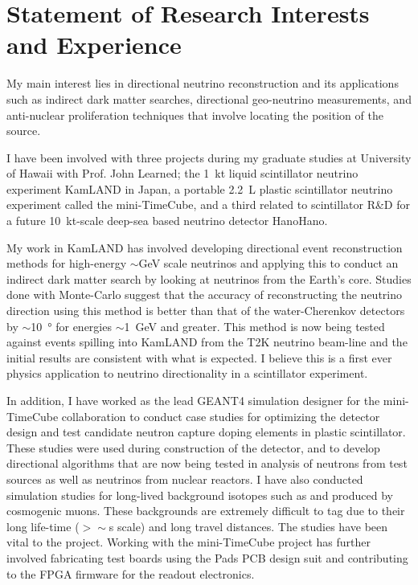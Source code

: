 \documentclass[a4paper,10pt]{article} %
\begin{document}

\section{Statement of Research Interests and Experience}
My main interest lies in directional neutrino reconstruction and its
applications such as indirect dark matter searches, directional geo-neutrino
measurements, and anti-nuclear proliferation techniques that involve locating
the position of the source.

I have been involved with three projects during my graduate studies at
University of Hawaii with Prof. John Learned; the \SI{1}{\kilo\tonne} liquid
scintillator neutrino experiment KamLAND in Japan, a portable
\SI{2.2}{\liter} plastic scintillator neutrino experiment called the
mini-TimeCube, and a third related to scintillator R\&D for a
future \SI{10}{\kilo\tonne}-scale deep-sea based neutrino detector HanoHano.

My work in KamLAND has involved developing directional event reconstruction
methods for high-energy $\sim$\si{\giga\electronvolt} scale neutrinos and
applying this to conduct an indirect dark matter search by looking at neutrinos
from the Earth's core.
Studies done with Monte-Carlo suggest that the accuracy of reconstructing the
neutrino direction using this method is better than that of the
water-Cherenkov detectors by $\sim$\SI{10}{\degree} for energies
$\sim$\SI{1}{\giga\electronvolt} and greater.
This method is now being tested against events spilling into KamLAND from the
T2K neutrino beam-line and the initial results are consistent with what is
expected.
I believe this is a first ever physics application to neutrino directionality in
a scintillator experiment.

In addition, I have worked as the lead GEANT4 simulation designer for the
mini-TimeCube collaboration to conduct case studies for optimizing the detector
design and test candidate neutron capture doping elements in plastic
scintillator.
These studies were used during construction of the detector, and to develop
directional algorithms that are now being tested in analysis of neutrons from
test sources as well as neutrinos from nuclear reactors.
I have also conducted simulation studies for long-lived background isotopes such
as  and  produced by cosmogenic muons.
These backgrounds are extremely difficult to tag due to their long life-time
($>\sim$\si{\second} scale) and long travel distances.
The studies have been vital to the project.
Working with the mini-TimeCube project has further involved fabricating test
boards using the Pads PCB design suit and contributing to the FPGA firmware for
the readout electronics.
\end{document}
